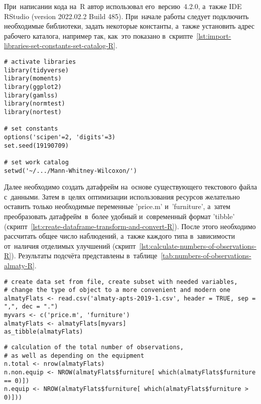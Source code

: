\documentclass[]{scrartcl}
\begin{document}
При~написании кода на~R автор использовал его~версию~4.2.0, а~также \foreignlanguage{english}{IDE RStudio (version 2022.02.2 Build 485)}. При~начале работы следует подключить необходимые библиотеки, задать некоторые константы, а~также установить адрес рабочего каталога, например так, как~это показано в~скрипте~\ref{lst:import-libraries-set-constants-set-catalog-R}.
%
\begin{lstlisting}[float, caption = Подключение библиотек и~задание значений констант и~адреса рабочего каталога, firstnumber=1, label= lst:import-libraries-set-constants-set-catalog-R]
# activate libraries
library(tidyverse)
library(moments)
library(ggplot2)
library(gamlss)
library(normtest)
library(nortest)

# set constants
options('scipen'=2, 'digits'=3)
set.seed(19190709)

# set work catalog
setwd('~/.../Mann-Whitney-Wilcoxon/')
\end{lstlisting}  
%

Далее необходимо создать датафрейм на~основе существующего текстового файла с~данными. Затем в~целях оптимизации использования ресурсов желательно оставить только необходимые переменные 'price.m' и~'furniture', а~затем преобразовать датафрейм~в~более удобный и~современный формат 'tibble' (скрипт~\ref{lst:create-dataframe-transform-and-convert-R}). После этого необходимо рассчитать общее число наблюдений, а~также каждого типа в~зависимости от~наличия отделимых улучшений (скрипт~\ref{lst:calculate-numbers-of-observations-R}). Результаты подсчёта представлены в~таблице~\ref{tab:numbers-of-observations-almaty-R}.
%
\begin{lstlisting}[float, caption = Создание датафрейма и его настройка, firstnumber=1, label= lst:create-dataframe-transform-and-convert-R]
# create data set from file, create subset with needed variables,
# change the type of object to a more convenient and modern one
almatyFlats <- read.csv('almaty-apts-2019-1.csv', header = TRUE, sep = ",", dec = ".")
myvars <- c('price.m', 'furniture')
almatyFlats <- almatyFlats[myvars]
as_tibble(almatyFlats)
\end{lstlisting} 
%
\begin{lstlisting}[float, caption = Подсчёт количества наблюдений, firstnumber=1, label= lst:calculate-numbers-of-observations-R]
# calculation of the total number of observations,
# as well as depending on the equipment 
n.total <- nrow(almatyFlats)
n.non.equip <- NROW(almatyFlats$furniture[ which(almatyFlats$furniture == 0)])
n.equip <- NROW(almatyFlats$furniture[ which(almatyFlats$furniture > 0)]))
\end{lstlisting}
%
\end{document}
